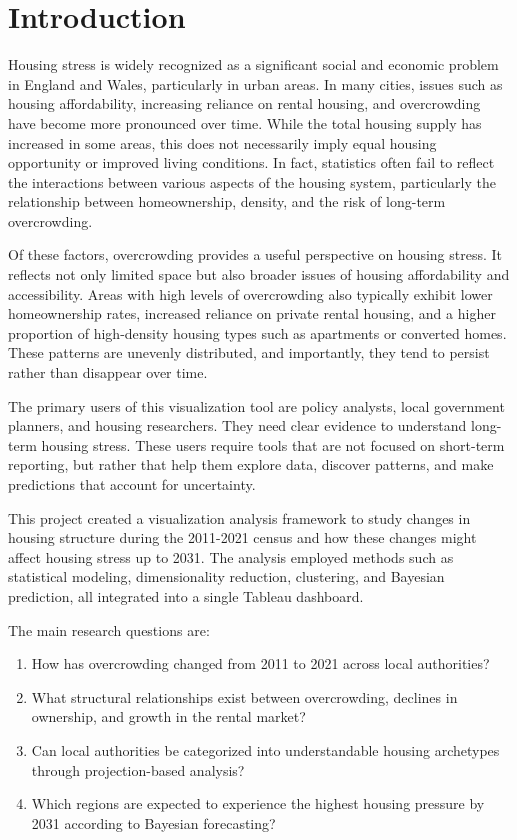 \documentclass[conference]{IEEEtran}
\begin{document}
\section{Introduction}
Housing stress is widely recognized as a significant social and economic problem in England and Wales, particularly in urban areas. In many cities, issues such as housing affordability, increasing reliance on rental housing, and overcrowding have become more pronounced over time. While the total housing supply has increased in some areas, this does not necessarily imply equal housing opportunity or improved living conditions. In fact, statistics often fail to reflect the interactions between various aspects of the housing system, particularly the relationship between homeownership, density, and the risk of long-term overcrowding.

Of these factors, overcrowding provides a useful perspective on housing stress. It reflects not only limited space but also broader issues of housing affordability and accessibility. Areas with high levels of overcrowding also typically exhibit lower homeownership rates, increased reliance on private rental housing, and a higher proportion of high-density housing types such as apartments or converted homes. These patterns are unevenly distributed, and importantly, they tend to persist rather than disappear over time.

The primary users of this visualization tool are policy analysts, local government planners, and housing researchers. They need clear evidence to understand long-term housing stress. These users require tools that are not focused on short-term reporting, but rather that help them explore data, discover patterns, and make predictions that account for uncertainty.

This project created a visualization analysis framework to study changes in housing structure during the 2011-2021 census and how these changes might affect housing stress up to 2031. The analysis employed methods such as statistical modeling, dimensionality reduction, clustering, and Bayesian prediction, all integrated into a single Tableau dashboard.

The main research questions are:
\begin{enumerate}
    \item How has overcrowding changed from 2011 to 2021 across local authorities?
    \item What structural relationships exist between overcrowding, declines in ownership, and growth in the rental market?
    \item Can local authorities be categorized into understandable housing archetypes through projection-based analysis?
    \item Which regions are expected to experience the highest housing pressure by 2031 according to Bayesian forecasting?
\end{enumerate}
\end{document}
